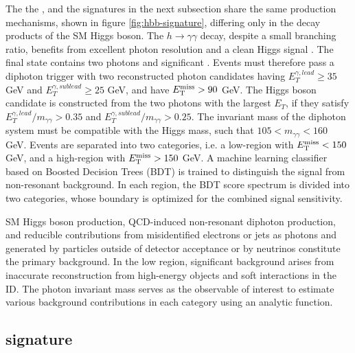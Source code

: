 The \monohgamgam the \monohbb, and the \monohtautau signatures in the next subsection share the same production mechanisms, shown in figure \ref{fig:hbb-signature}, differing only in the decay products of the SM Higgs boson.
The $h\rightarrow \gamma\gamma$ decay, despite a small branching ratio, benefits from excellent photon resolution and a clean Higgs signal \cite{HIGG-2019-02}. The final state contains two photons and significant \met. Events must therefore pass a diphoton trigger with two reconstructed photon candidates having $E_{T}^{\gamma,lead}\ge 35$ GeV and $E_T^{\gamma, sublead}\ge 25$ GeV, and have $E_{\mathrm{T}}^{\mathrm{miss}}>90$ GeV. The Higgs boson candidate is constructed from the two photons with the largest $E_T$, if they satisfy $E_T^{\gamma, lead}/m_{\gamma\gamma} > 0.35$ and $E_T^{\gamma, sublead}/m_{\gamma\gamma} > 0.25$. The invariant mass of the diphoton system must be compatible with the Higgs mass, such that $105 < m_{\gamma\gamma} < 160$ GeV. Events are separated into two categories, i.e. a low-\met region with $E_{\mathrm{T}}^{\mathrm{miss}}<150$ GeV, and a high-\met region with $E_{\mathrm{T}}^{\mathrm{miss}}>150$ GeV. A machine learning classifier based on Boosted Decision Trees (BDT) is trained to distinguish the \thdma signal from non-resonant background. In each \met region, the BDT score spectrum is divided into two categories, whose boundary is optimized for the combined signal sensitivity. 

SM Higgs boson production, QCD-induced non-resonant diphoton production, and reducible contributions from misidentified electrons or jets as photons and \met generated by particles outside of detector acceptance or by neutrinos constitute the primary background. In the low \met region, significant background arises from inaccurate \met reconstruction from high-energy objects and soft interactions in the ID. The photon invariant mass serves as the observable of interest to estimate various background contributions in each category using an analytic function.

\subsection{\texorpdfstring{\monohtautau}{TEXT} signature}

